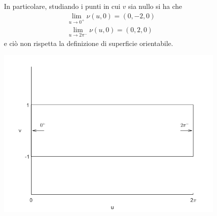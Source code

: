 \begin{example} 
\begin{figure}[H]
\begin{minipage}{0.5\textwidth}
 In particolare, studiando i punti in cui $v$ sia nullo si ha che
 \begin{align*}
     &\lim_{u \to 0^+} \nu (u,0) = (0,-2,0)\\
     &\lim_{u \to 2\pi^-} \nu (u,0) = (0,2,0)
 \end{align*}
 e ciò non rispetta la definizione di superficie orientabile.
 \end{minipage}
 \begin{minipage}{0.3\textwidth}
     \includegraphics[width=\textwidth]{Capitoli/Capitolo6/Area per calcolo orientazione.png}
 \end{minipage}
 \end{figure}
 \end{example}
